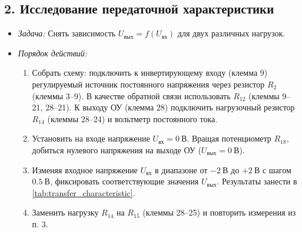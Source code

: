 \subsection*{2. Исследование передаточной характеристики}
\begin{itemize}
    \item \textit{Задача:} Снять зависимость $U_{\text{вых}} = f(U_{\text{вх}})$ для двух различных нагрузок.
    \item \textit{Порядок действий:}
        \begin{enumerate}
            \item Собрать схему: подключить к инвертирующему входу (клемма 9) регулируемый источник постоянного напряжения через резистор $R_2$ (клеммы 3--9). В качестве обратной связи использовать $R_{12}$ (клеммы 9--21, 28--21). К выходу ОУ (клемма 28) подключить нагрузочный резистор $R_{14}$ (клеммы 28--24) и вольтметр постоянного тока.
            \item Установить на входе напряжение $U_{\text{вх}} = 0~\text{В}$. Вращая потенциометр $R_{18}$, добиться нулевого напряжения на выходе ОУ ($U_{\text{вых}} = 0~\text{В}$).
            \item Изменяя входное напряжение $U_{\text{вх}}$ в диапазоне от $-2~\text{В}$ до $+2~\text{В}$ с шагом $0.5~\text{В}$, фиксировать соответствующие значения $U_{\text{вых}}$. Результаты занести в \cref{tab:transfer_characteristic}.
            \item Заменить нагрузку $R_{14}$ на $R_{15}$ (клеммы 28--25) и повторить измерения из п. 3.
        \end{enumerate}
\end{itemize}

